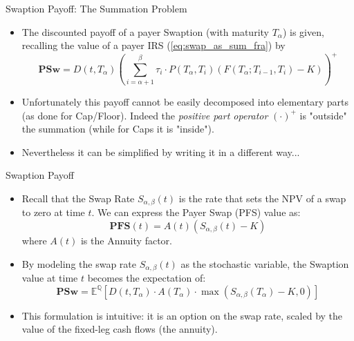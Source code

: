 \documentclass{beamer}
\begin{document}
\begin{frame}{Swaption Payoff: The Summation Problem}
	\begin{itemize}
		\item<1-> The discounted payoff of a payer Swaption (with maturity $T_\alpha$) is given, recalling the value of a payer IRS (\cref{eq:swap_as_sum_fra}) by
		\begin{equation}
			\textbf{PSw}=D(t,T_\alpha)\left(\sum_{i=\alpha+1}^\beta \tau_i\cdot P(T_\alpha,T_i) (F(T_\alpha;T_{i-1},T_i) - K)\right)^+
			\label{eq:swaption_payoff_std}
		\end{equation}
		\item<2-> Unfortunately this payoff \textcolor{maincolor}{cannot} be easily decomposed into elementary parts (as done for Cap/Floor). Indeed the \emph{positive part operator} $(\cdot)^+$ is "outside" the summation (while for Caps it is "inside").
		\item<3-> Nevertheless it can be simplified by writing it in a different way...
	\end{itemize}
\end{frame}

\begin{frame}{Swaption Payoff}
	\begin{itemize}
		\item<1-> Recall that the Swap Rate $S_{\alpha,\beta}(t)$ is the rate that sets the NPV of a swap to zero at time $t$. We can express the Payer Swap (PFS) value as:
		\begin{equation*}
			\textbf{PFS}(t) = A(t) \left( S_{\alpha,\beta}(t) - K \right)
		\end{equation*}
		where $A(t)$ is the \textcolor{maincolor}{Annuity} factor.
		\item<2-> By modeling the swap rate $S_{\alpha,\beta}(t)$ as the stochastic variable, the Swaption value at time $t$ becomes the expectation of:
		\begin{equation}
			\textbf{PSw} = \mathbb{E}^{\mathbb{Q}} \left[ D(t, T_\alpha)\cdot A(T_\alpha)\cdot \max(S_{\alpha,\beta}(T_\alpha) - K, 0) \right]	
		\label{eq:swaption_payoff_annuity}				
		\end{equation}
		\item<3-> This formulation is intuitive: it is an option on the swap rate, scaled by the value of the fixed-leg cash flows (the annuity).
	\end{itemize}
\end{frame}
\end{document}
